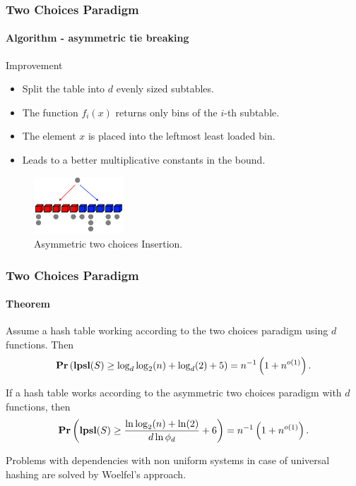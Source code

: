 \begin{frame}
	\frametitle{Two Choices Paradigm}
	\framesubtitle{Algorithm - asymmetric tie breaking}
	
	\begin{block}{Improvement}
		\begin{itemize}
			\item Split the table into $d$ evenly sized subtables.
			\item The function $f_i(x)$ returns only bins of the $i$-th subtable.
			\item The element $x$ is placed into the leftmost least loaded bin.
			\item Leads to a better multiplicative constants in the bound.
		\end{itemize}
	\end{block}
	
	\begin{figure}
		\includegraphics[width=0.3\textwidth]{two-choices-asymmetric.png}
		
		\caption{Asymmetric two choices Insertion.}
	\end{figure}
\end{frame}

\begin{frame}
	\frametitle{Two Choices Paradigm}
	\framesubtitle{Theorem}
	
	\begin{theorem}
		Assume a hash table working according to the two choices paradigm using $d$ functions. Then
		\[
			\mathbf{Pr}\left(\mathbf{lpsl}(S) \geq \log_d \log_2(n) + \log_d(2) + 5\right) = n^{-1}\left( 1 + n^{o(1)}\right).
		\]

		If a hash table works according to the asymmetric two choices paradigm with $d$ functions, then
		\[
			\mathbf{Pr}\left(\mathbf{lpsl}(S) \geq \frac{\ln \log_2(n) + \ln(2)}{d \ln \phi_d} + 6\right) = n^{-1}\left( 1 + n^{o(1)}\right).
		\]
	\end{theorem}
	
	Problems with dependencies with non uniform systems in case of universal hashing are solved by Woelfel's approach.
\end{frame}


